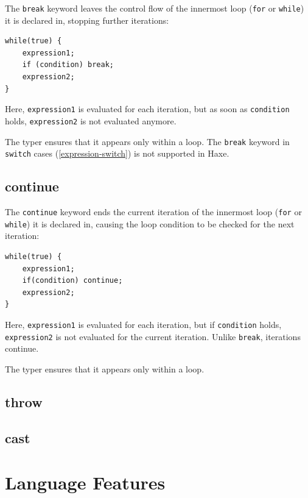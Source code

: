 \documentclass[a4paper,oneside]{book}
\newcommand{\expr}[1]{\texttt{#1}}
\newcommand{\tref}[2]{#1 (\ref{#2})}
\begin{document}
The \expr{break} keyword leaves the control flow of the innermost loop (\expr{for} or \expr{while}) it is declared in, stopping further iterations:

\begin{lstlisting}
while(true) {
	expression1;
	if (condition) break;
	expression2;
}
\end{lstlisting}

Here, \expr{expression1} is evaluated for each iteration, but as soon as \expr{condition} holds, \expr{expression2} is not evaluated anymore.

The typer ensures that it appears only within a loop. The \expr{break} keyword in \tref{\expr{switch} cases}{expression-switch} is not supported in Haxe.


\section{continue}
\label{expression-continue}

The \expr{continue} keyword ends the current iteration of the innermost loop (\expr{for} or \expr{while}) it is declared in, causing the loop condition to be checked for the next iteration:

\begin{lstlisting}
while(true) {
	expression1;
	if(condition) continue;
	expression2;
}
\end{lstlisting}

Here, \expr{expression1} is evaluated for each iteration, but if \expr{condition} holds, \expr{expression2} is not evaluated for the current iteration. Unlike \expr{break}, iterations continue.

The typer ensures that it appears only within a loop.


\section{throw}
\label{expression-throw}

\section{cast}
\label{expression-cast}





\chapter{Language Features}
\label{lf}
\end{document}
